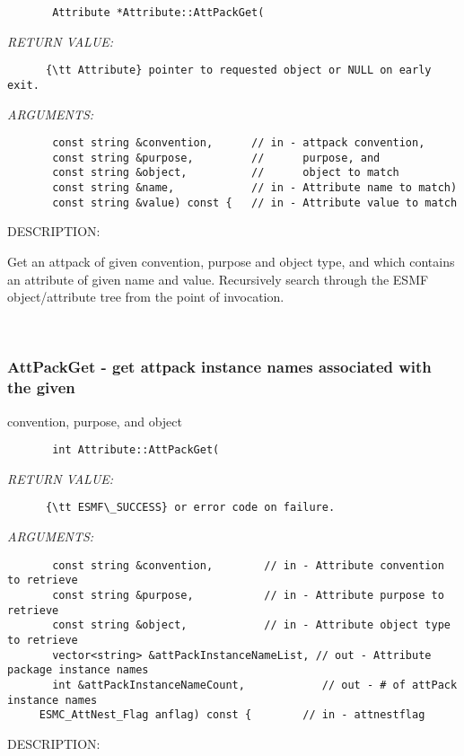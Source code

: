  
\begin{verbatim}       Attribute *Attribute::AttPackGet(
   \end{verbatim}{\em RETURN VALUE:}
\begin{verbatim}      {\tt Attribute} pointer to requested object or NULL on early exit.
   \end{verbatim}{\em ARGUMENTS:}
\begin{verbatim}       const string &convention,      // in - attpack convention,
       const string &purpose,         //      purpose, and
       const string &object,          //      object to match
       const string &name,            // in - Attribute name to match)
       const string &value) const {   // in - Attribute value to match
   \end{verbatim}
{\sf DESCRIPTION:\\ }


       Get an attpack of given convention, purpose and object type, and which
       contains an attribute of given name and value.  Recursively search
       through the ESMF object/attribute tree from the point of invocation.
   
 
\mbox{}\hrulefill\
 
\subsubsection [AttPackGet] {AttPackGet - get attpack instance names associated with the given}


                            convention, purpose, and object
  
\begin{verbatim}       int Attribute::AttPackGet(
   \end{verbatim}{\em RETURN VALUE:}
\begin{verbatim}      {\tt ESMF\_SUCCESS} or error code on failure.
   \end{verbatim}{\em ARGUMENTS:}
\begin{verbatim}       const string &convention,        // in - Attribute convention to retrieve
       const string &purpose,           // in - Attribute purpose to retrieve
       const string &object,            // in - Attribute object type to retrieve
       vector<string> &attPackInstanceNameList, // out - Attribute package instance names
       int &attPackInstanceNameCount,            // out - # of attPack instance names
     ESMC_AttNest_Flag anflag) const {        // in - attnestflag\end{verbatim}
{\sf DESCRIPTION:\\ }



